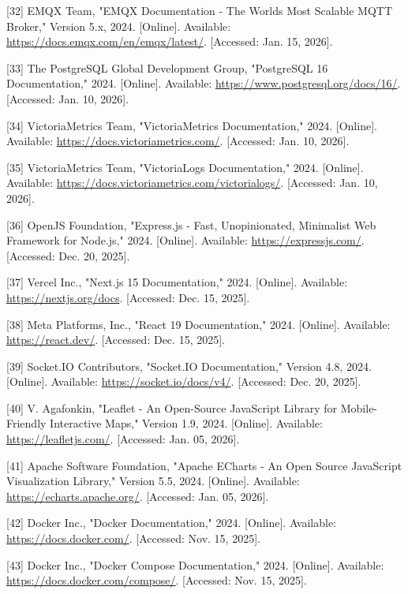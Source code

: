 \documentclass[a4paper]{extarticle}
\begin{document}
{[}32{]} EMQX Team, "EMQX Documentation - The World\textquotesingle s
Most Scalable MQTT Broker," Version 5.x, 2024. {[}Online{]}. Available:
\url{https://docs.emqx.com/en/emqx/latest/}. {[}Accessed: Jan. 15,
2026{]}.

{[}33{]} The PostgreSQL Global Development Group, "PostgreSQL 16
Documentation," 2024. {[}Online{]}. Available:
\url{https://www.postgresql.org/docs/16/}. {[}Accessed: Jan. 10,
2026{]}.

{[}34{]} VictoriaMetrics Team, "VictoriaMetrics Documentation," 2024.
{[}Online{]}. Available: \url{https://docs.victoriametrics.com/}.
{[}Accessed: Jan. 10, 2026{]}.

{[}35{]} VictoriaMetrics Team, "VictoriaLogs Documentation," 2024.
{[}Online{]}. Available:
\url{https://docs.victoriametrics.com/victorialogs/}. {[}Accessed: Jan.
10, 2026{]}.

{[}36{]} OpenJS Foundation, "Express.js - Fast, Unopinionated,
Minimalist Web Framework for Node.js," 2024. {[}Online{]}. Available:
\url{https://expressjs.com/}. {[}Accessed: Dec. 20, 2025{]}.

{[}37{]} Vercel Inc., "Next.js 15 Documentation," 2024. {[}Online{]}.
Available: \url{https://nextjs.org/docs}. {[}Accessed: Dec. 15, 2025{]}.

{[}38{]} Meta Platforms, Inc., "React 19 Documentation," 2024.
{[}Online{]}. Available: \url{https://react.dev/}. {[}Accessed: Dec. 15,
2025{]}.

{[}39{]} Socket.IO Contributors, "Socket.IO Documentation," Version 4.8,
2024. {[}Online{]}. Available: \url{https://socket.io/docs/v4/}.
{[}Accessed: Dec. 20, 2025{]}.

{[}40{]} V. Agafonkin, "Leaflet - An Open-Source JavaScript Library for
Mobile-Friendly Interactive Maps," Version 1.9, 2024. {[}Online{]}.
Available: \url{https://leafletjs.com/}. {[}Accessed: Jan. 05, 2026{]}.

{[}41{]} Apache Software Foundation, "Apache ECharts - An Open Source
JavaScript Visualization Library," Version 5.5, 2024. {[}Online{]}.
Available: \url{https://echarts.apache.org/}. {[}Accessed: Jan. 05,
2026{]}.

{[}42{]} Docker Inc., "Docker Documentation," 2024. {[}Online{]}.
Available: \url{https://docs.docker.com/}. {[}Accessed: Nov. 15,
2025{]}.

{[}43{]} Docker Inc., "Docker Compose Documentation," 2024.
{[}Online{]}. Available: \url{https://docs.docker.com/compose/}.
{[}Accessed: Nov. 15, 2025{]}.
\end{document}
